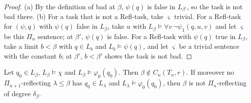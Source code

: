 \documentclass[11pt]{article}
\begin{document}
\begin{proof}
(a) By the definition of bad at $\beta$, $\psi(q)$ is false in $L_{\beta'}$, so the task is not bad there. (b) For a
task that is not a Refl-task, take $\varsigma$ trivial. For a Refl-task for $(\psi, q)$ with $\psi(q)$ false in
$L_\beta$, take $u$ with $L_\beta \models \forall v\, \neg\psi_1(q,u,v)$ and let $\varsigma$ be this $\Pi_n$ sentence;
at $\beta'$, $\psi(q)$ is false. For a Refl-task with $\psi(q)$ true in $L_\beta$, take a limit $b < \beta$ with $q \in
L_b$ and $L_b \models \psi(q)$, and let $\varsigma$ be a trivial sentence with the constant $b$; at $\beta'$, $b <
\beta'$ shows the task is not bad.
\end{proof}

\begin{statement} Let $q_0 \in L_\beta$, $L_\beta \models \chi$ and
$L_\beta \models \varphi_0(q_0)$. Then $\beta \notin C_n(T_n, r)$. If moreover no $\Pi_{n+1}$-reflecting $\lambda \le
\beta$ has $q_0 \in L_\lambda$ and $L_\lambda \models \varphi_0(q_0)$, then $\beta$ is not $\Pi_n$-reflecting of degree
$\delta_\beta$.
\end{statement}
\end{document}
